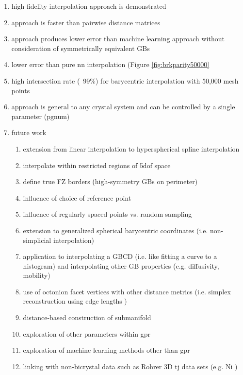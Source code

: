 \documentclass[preprint,12pt]{elsarticle}
\begin{document}
\begin{enumerate}
    \item high fidelity interpolation approach is demonstrated
    \item approach is faster than pairwise distance matrices
    \item approach produces lower error than machine learning approach without consideration of symmetrically equivalent GBs \cite{echeverrirestrepoUsingArtificialNeural2014}
    \item lower error than pure \gls{nn} interpolation (Figure \ref{fig:brkparity50000}
    \item high intersection rate (~99\%) for barycentric interpolation with 50,000 mesh points
    \item approach is general to any crystal system and can be controlled by a single parameter (pgnum) %
    \item future work
    \begin{enumerate}
        \item extension from linear interpolation to hyperspherical spline interpolation \cite{taijeronSplineInterpolationSmoothing1994}
        \item interpolate within restricted regions of \gls{5dof} space
        \item define true FZ borders (high-symmetry GBs on perimeter)
        \item influence of choice of reference point
        \item influence of regularly spaced points vs. random sampling
        \item extension to generalized spherical barycentric coordinates (i.e. non-simplicial interpolation) \cite{langerSphericalBarycentricCoordinates2006}
        \item application to interpolating a GBCD (i.e. like fitting a curve to a histogram) and interpolating other GB properties (e.g. diffusivity, mobility)
        \item use of octonion facet vertices with other distance metrics (i.e. simplex reconstruction using edge lengths \cite{connorHighdimensionalSimplexesSupermetric2017})
        \item distance-based construction of submanifold \cite{boissonnatOnlyDistancesAre2017}
        \item exploration of other parameters within \gls{gpr}
        \item exploration of machine learning methods other than \gls{gpr}
        \item linking with non-bicrystal data such as Rohrer 3D \gls{tj} data sets (e.g. Ni \cite{liRelativeGrainBoundary2009})
    \end{enumerate}
\end{enumerate}
\end{document}
